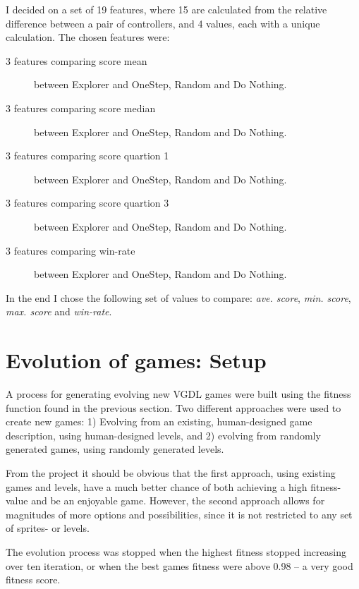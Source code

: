 \documentclass[a4paper,titlepage,final]{report}
\begin{document}
I decided on a set of 19 features, where 15 are calculated from the relative difference between a pair of controllers, and 4 values, each with a unique calculation.
The chosen features were:

\begin{description}
\item[3 features comparing score mean] between Explorer and OneStep, Random and Do Nothing.
\item[3 features comparing score median] between Explorer and OneStep, Random and Do Nothing.
\item[3 features comparing score quartion 1] between Explorer and OneStep, Random and Do Nothing.
\item[3 features comparing score quartion 3]  between Explorer and OneStep, Random and Do Nothing.
\item[3 features comparing win-rate] between Explorer and OneStep, Random and Do Nothing.

\end{description}

In the end I chose the following set of values to compare: \textit{ave. score},  \textit{min. score}, \textit{max. score} and \textit{win-rate}.




\section{Evolution of games: Setup}
\label{sec_task2evolvingGames}
A process for generating evolving new VGDL games were built using the fitness function found in the previous section.
Two different approaches were used to create new games:
1) Evolving from an existing, human-designed game description, using human-designed levels, and 2) evolving from randomly generated games, using randomly generated levels.

From the project it should be obvious that the first approach, using existing games and levels, have a much better chance of both achieving a high fitness-value and be an enjoyable game.
However, the second approach allows for magnitudes of more options and possibilities, since it is not restricted to any set of sprites- or levels.

The evolution process was stopped when the highest fitness stopped increasing over ten iteration, or when the best games fitness were above 0.98 -- a very good fitness score.
\end{document}
